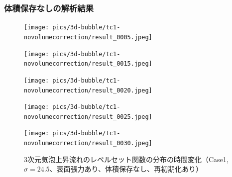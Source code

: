 \subsubsection{体積保存なしの解析結果}
\begin{figure}[H]
	\centering
	\begin{minipage}[b]{0.16\columnwidth}
	    \centering
	    \texttt{[image: pics/3d-bubble/tc1-novolumecorrection/result\_0005.jpeg]}
	\end{minipage}
	\begin{minipage}[b]{0.16\columnwidth}
	    \centering
	    \texttt{[image: pics/3d-bubble/tc1-novolumecorrection/result\_0015.jpeg]}
	\end{minipage}
	\begin{minipage}[b]{0.16\columnwidth}
	    \centering
	    \texttt{[image: pics/3d-bubble/tc1-novolumecorrection/result\_0020.jpeg]}
	\end{minipage}
	\begin{minipage}[b]{0.16\columnwidth}
	    \centering
	    \texttt{[image: pics/3d-bubble/tc1-novolumecorrection/result\_0025.jpeg]}
	\end{minipage}
	\begin{minipage}[b]{0.16\columnwidth}
	    \centering
	    \texttt{[image: pics/3d-bubble/tc1-novolumecorrection/result\_0030.jpeg]}
	\end{minipage}

	\caption{3次元気泡上昇流れのレベルセット関数の分布の時間変化（Case1, $\sigma=24.5$、表面張力あり、体積保存なし、再初期化あり）}
	\label{fig:3d-bubble_result_tc1}
\end{figure}

